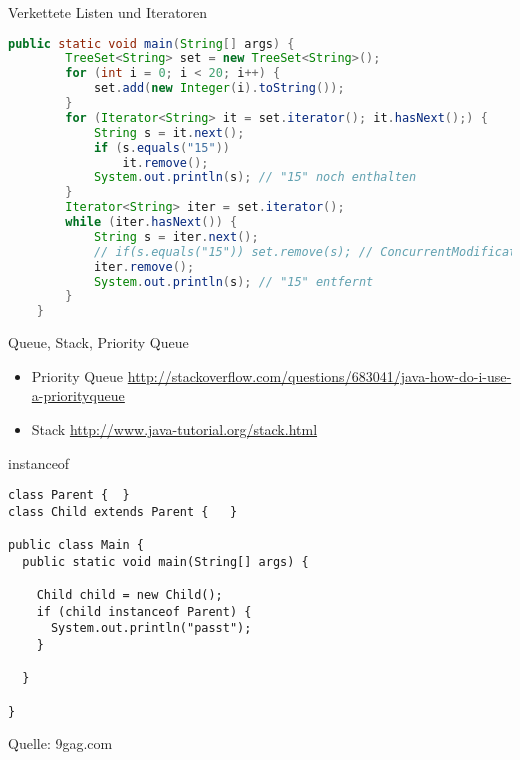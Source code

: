 \documentclass[18pt]{beamer}
\begin{document}
\begin{frame}[fragile]{Verkettete Listen und Iteratoren}
\begin{lstlisting}[language=java]
    public static void main(String[] args) {
        TreeSet<String> set = new TreeSet<String>();
        for (int i = 0; i < 20; i++) {
            set.add(new Integer(i).toString());
        }
        for (Iterator<String> it = set.iterator(); it.hasNext();) {
            String s = it.next();
            if (s.equals("15"))
                it.remove();
            System.out.println(s); // "15" noch enthalten
        }
        Iterator<String> iter = set.iterator();
        while (iter.hasNext()) {
            String s = iter.next();
            // if(s.equals("15")) set.remove(s); // ConcurrentModificationException
            iter.remove();
            System.out.println(s); // "15" entfernt
        }
    }
\end{lstlisting}

\end{frame}


\begin{frame}{Queue, Stack, Priority Queue}
\begin{itemize}
 \item Priority Queue \url{http://stackoverflow.com/questions/683041/java-how-do-i-use-a-priorityqueue}
 \item Stack \url{http://www.java-tutorial.org/stack.html}
\end{itemize}

 
\end{frame}

\begin{frame}[fragile]{instanceof}
 \begin{lstlisting}
class Parent {  }
class Child extends Parent {   }

public class Main {
  public static void main(String[] args) {

    Child child = new Child();
    if (child instanceof Parent) {
      System.out.println("passt");
    }

  }

}
 \end{lstlisting}

\end{frame}


\begin{frame}
 
 \tiny{Quelle: 9gag.com}
\end{frame}
\end{document}
